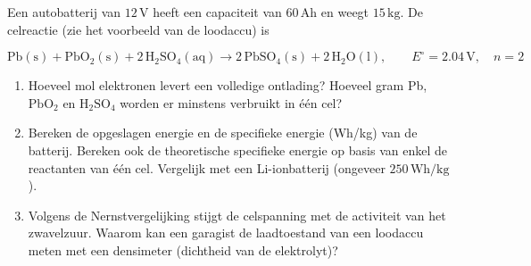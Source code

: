 \begin{oefening}
Een autobatterij van \(12\,\mathrm{V}\) heeft een capaciteit van \(60\,\mathrm{Ah}\) en weegt \(15\,\mathrm{kg}\). De celreactie (zie het voorbeeld van de loodaccu) is

\[
\mathrm{Pb(s) + PbO_2(s) + 2\,H_2SO_4(aq) \rightarrow 2\,PbSO_4(s) + 2\,H_2O(l)}, \qquad E^\circ = 2.04\,\mathrm{V}, \quad n = 2
\]

\begin{enumerate}
\item[(a)]
  Hoeveel mol elektronen levert een volledige ontlading? Hoeveel gram Pb, \(\mathrm{PbO_2}\) en \(\mathrm{H_2SO_4}\) worden er minstens verbruikt in één cel?
\item[(b)]
  Bereken de opgeslagen energie en de specifieke energie (Wh/kg) van de batterij. Bereken ook de theoretische specifieke energie op basis van enkel de reactanten van één cel. Vergelijk met een Li-ionbatterij (ongeveer \(250\,\mathrm{Wh/kg}\)).
\item[(c)]
  Volgens de Nernstvergelijking stijgt de celspanning met de activiteit van het zwavelzuur. Waarom kan een garagist de laadtoestand van een loodaccu meten met een densimeter (dichtheid van de elektrolyt)?
\end{enumerate}
\end{oefening}
